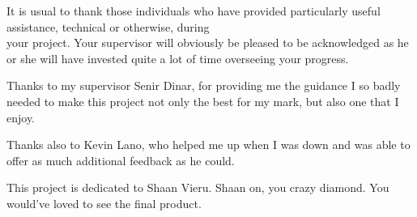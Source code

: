 It is usual to thank those individuals who have provided particularly useful assistance, technical or otherwise, during\\ your project. Your supervisor will obviously be pleased to be acknowledged as he or she will have invested quite a lot of time overseeing your progress.

Thanks to my supervisor Senir Dinar, for providing me the guidance I so badly needed to make this project not only the best for my mark, but also one that I enjoy.

Thanks also to Kevin Lano, who helped me up when I was down and was able to offer as much additional feedback as he could.

This project is dedicated to Shaan Vieru. Shaan on, you crazy diamond. You would've loved to see the final product.